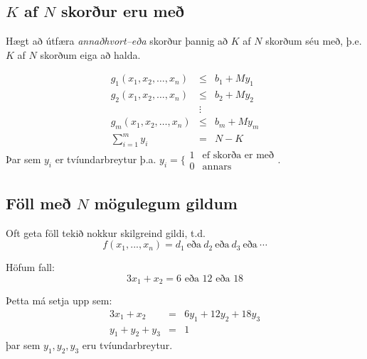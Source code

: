 \subsection{$K$ af $N$ skorður eru með}
Hægt að útfæra \emph{annaðhvort--eða} skorður þannig að $K$ af $N$ skorðum séu með, þ.e. $K$ af $N$ skorðum eiga að halda.

\begin{daemi}\hspace{.1cm}
\begin{eqnarray*}
g_1(x_1,x_2,\ldots, x_n) &\le& b_1 + My_1\\
g_2(x_1,x_2,\ldots, x_n) &\le& b_2 + My_2\\
& \vdots & \\
g_m(x_1,x_2,\ldots, x_n) &\le& b_m + My_m\\
\sum_{i=1}^m y_i &=& N - K
\end{eqnarray*}
Þar sem $y_i$ er tvíundarbreytur þ.a. $y_i=\Bigg\{\begin{array}{cl}1 & \mbox{ef skorða er með}\\0 &\mbox{annars}\end{array}$.
\end{daemi}


\subsection{Föll með $N$ mögulegum gildum}
Oft geta föll tekið nokkur skilgreind gildi, t.d.
$$ f(x_1,...,x_n)=d_1~\mbox{eða}~d_2~\mbox{eða}~d_3~\mbox{eða}~\cdots$$
\begin{daemi} Höfum fall: $$ 3 x_1+ x_2 = 6 \mbox{ eða } 12 \mbox{ eða } 18$$\end{daemi}
 \begin{lausn}Þetta má setja upp sem:
\begin{eqnarray*}
3 x_1 + x_2 & = & 6 y_1 + 12 y_2 + 18 y_3 \\
y_1 + y_2 + y_3 & = & 1
\end{eqnarray*}
þar sem  $y_1, y_2, y_3$ eru tvíundarbreytur.
\end{lausn}

